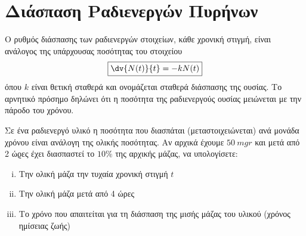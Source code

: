 \section*{Διάσπαση Ραδιενεργών Πυρήνων}

Ο ρυθμός διάσπασης των ραδιενεργών στοιχείων, κάθε χρονική στιγμή, είναι ανάλογος της 
υπάρχουσας ποσότητας του στοιχείου
\[
  \boxed{\dv{N(t)}{t} = -k N(t)}
\] 
όπου $k$ είναι θετική σταθερά και ονομάζεται σταθερά διάσπασης της ουσίας. Το αρνητικό 
πρόσημο δηλώνει ότι η ποσότητα της ραδιενεργούς ουσίας μειώνεται με την πάροδο του 
χρόνου.

\begin{problem}
  Σε ένα ραδιενεργό υλικό η ποσότητα που διασπάται (μεταστοιχειώνεται) ανά μονάδα 
  χρόνου είναι ανάλογη της ολικής ποσότητας. Αν αρχικά έχουμε $ \SI{50}{mgr} $ και 
  μετά από 2 ώϱες έχει διασπαστεί το $ 10 \% $ της αρχικής μάζας, να υπολογίσετε:
  \begin{enumerate}[i)]
    \item Την ολική μάζα την τυχαία χρονική στιγμή $t$ 
    \item Την ολική μάζα μετά από 4 ώρες
    \item Το χρόνο που απαιτείται για τη διάσπαση της μισής μάζας του υλικού (χρόνος
      ημίσειας ζωής)
  \end{enumerate}
\end{problem}
